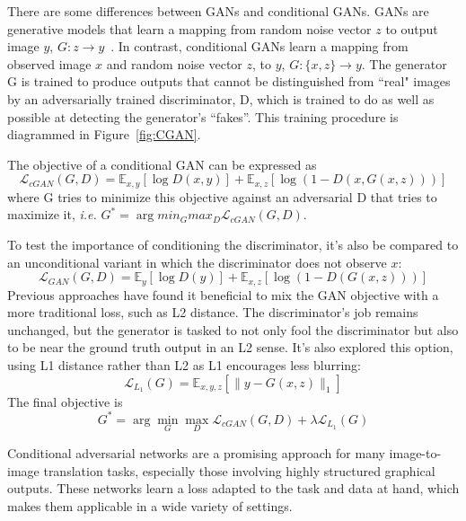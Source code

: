 \documentclass[a4paper]{article}
\begin{document}
There are some differences between GANs and conditional GANs. GANs are generative models that learn a mapping from random noise vector $z$ to output image $y$, $G:z\rightarrow y$~\cite{Goodfellow2014Generative}. In contrast, conditional GANs learn a mapping from observed image $x$ and random noise vector $z$, to $y$, $G:\{x,z\}\rightarrow y$. The generator G is trained to produce outputs that cannot be distinguished from ``real" images by an adversarially trained discriminator, D, which is trained to do as well as possible at detecting the generator’s “fakes”. This training procedure is diagrammed in Figure~\ref{fig:CGAN}.\par
The objective of a conditional GAN can be expressed as
\begin{equation}
\mathcal{L}_{cGAN}(G,D)=\mathbb{E}_{x,y}[\log D(x,y)]+\mathbb{E}_{x,z}[\log(1-D(x,G(x,z)))]
\end{equation} 
where G tries to minimize this objective against an adversarial D that tries to maximize it, \emph{i.e.} $G^*=\arg min_G max_D \mathcal{L}_{cGAN}(G,D)$.\par
To test the importance of conditioning the discriminator, it's also be compared to an unconditional variant in which the discriminator does not observe $x$:
\begin{equation}
\mathcal{L}_{GAN}(G,D)=\mathbb{E}_y[\log D(y)]+\mathbb{E}_{x,z}[\log(1-D(G(x,z)))]
\end{equation}
Previous approaches have found it beneficial to mix the GAN objective with a more traditional loss, such as L2 distance. The discriminator’s job remains unchanged, but the generator is tasked to not only fool the discriminator but also to be near the ground truth output in an L2 sense. It's also explored this option, using L1 distance rather than L2 as L1 encourages less blurring:
\begin{equation}
\mathcal{L}_{L_1}(G)=\mathbb{E}_{x,y,z}[\lVert y-G(x,z)\rVert_1]
\end{equation}
The final objective is
\begin{equation}
G^*=\arg \min_{G} \max_{D} \mathcal{L}_{cGAN}(G,D)+\lambda \mathcal{L}_{L_1}(G)
\end{equation}\par
Conditional adversarial networks are a promising approach for many image-to-image translation tasks, especially those involving highly structured graphical outputs. These networks learn a loss adapted to the task and data at hand, which makes them applicable in a wide variety of settings.\par
\end{document}
